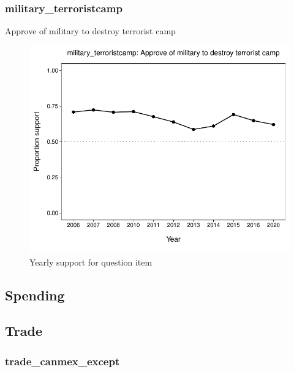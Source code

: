 \documentclass[
  12pt]{article}
\begin{document}
\hypertarget{military_terroristcamp}{%
\subsubsection{military\_terroristcamp}\label{military_terroristcamp}}

Approve of military to destroy terrorist camp

\begin{figure}

{\centering \includegraphics{error-checking_files/figure-latex/unnamed-chunk-3-34} 

}

\caption{Yearly support for question item}\label{fig:unnamed-chunk-3-34}
\end{figure}

\newpage

\hypertarget{spending}{%
\subsection{Spending}\label{spending}}

\newpage

\hypertarget{trade}{%
\subsection{Trade}\label{trade}}

\hypertarget{trade_canmex_except}{%
\subsubsection{trade\_canmex\_except}\label{trade_canmex_except}}
\end{document}
